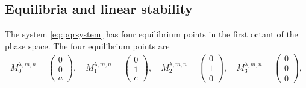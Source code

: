 \documentclass[a4paper,11pt]{article}
\numberwithin{step}{dummy}
\begin{document}
\subsection{Equilibria and linear stability} \label{sec:equi}
The system \eqref{eq:pqrsystem} has four equilibrium points in the first octant of the phase space. The four equilibrium points are
\begin{align*}
 M_0^{ \lambda,m,n} 
     = \begin{pmatrix} 
        0 \\ 0 \\ a
       \end{pmatrix}, \quad
 M_1^{ \lambda,m,n} 
     = \begin{pmatrix} 
         0 \\  1  \\ c 
       \end{pmatrix}, \quad
 M_2^{ \lambda,m,n} 
     = \begin{pmatrix} 
        0 \\ 1 \\ 0
       \end{pmatrix}, \quad
 M_3^{ \lambda,m,n} 
     = \begin{pmatrix} 
        0 \\ 0 \\ 0
       \end{pmatrix},    
\end{align*}
\end{document}
